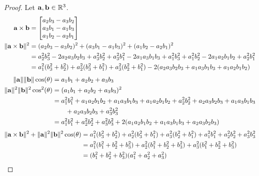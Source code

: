 \documentclass[../main.tex]{subfiles}
\begin{document}
\begin{proof}
	Let $\mathbf{a}, \mathbf{b} \in \mathbb{R}^3$.
	\begin{align*}
		\mathbf{a}\times\mathbf{b}       & =\begin{bmatrix}a_2b_3-a_3b_2\\a_3b_1-a_1b_3\\a_1b_2-a_2b_1\end{bmatrix}                                     \\
		\|\mathbf{a}\times\mathbf{b}\|^2 & =(a_2b_3-a_3b_2)^2+(a_3b_1-a_1b_3)^2+(a_1b_2-a_2b_1)^2                                                       \\
		                             & =a_2^2b_3^2-2a_2a_3b_2b_3+a_3^2b_2^2+a_3^2b_1^2-2a_1a_3b_1b_3+a_1^2b_3^2+a_1^2b_2^2-2a_1a_2b_1b_2+a_2^2b_1^2 \\
		                             & =a_1^2(b_3^2+b_2^2)+a_2^2(b_3^2+b_1^2)+a_3^2(b_2^2+b_1^2)-2(a_2a_3b_2b_3+a_1a_3b_1b_3+a_1a_2b_1b_2)          \\
	\end{align*}
	\begin{align*}
		\|\mathbf{a}\|\|\mathbf{b}\|\cos (\theta)       & =a_1b_1+a_2b_2+a_3b_3                                                                   \\
		\|\mathbf{a}\|^2\|\mathbf{b}\|^2\cos^2 (\theta) & =(a_1b_1+a_2b_2+a_3b_3)^2                                                               \\
		                                            & =a_1^2b_1^2+a_1a_2b_1b_2+a_1a_3b_1b_3+a_1a_2b_1b_2+a_2^2b_2^2+a_2a_3b_2b_3+a_1a_3b_1b_3 \\
		                                            & \qquad +a_2a_3b_2b_3+a_3^2b_3^2                                                         \\
		                                            & =a_1^2b_1^2+a_2^2b_2^2+a_3^2b_3^2+2(a_1a_2b_1b_2+a_1a_3b_1b_3+a_2a_3b_2b_3)
	\end{align*}
	\begin{align*}
		\|\vect{a}\times\vect{b}\|^2+\|\vect{a}\|^2\|\vect{b}\|^2\cos (\theta) & =a_1^2(b_3^2+b_2^2)+a_2^2(b_3^2+b_1^2)+a_3^2(b_2^2+b_1^2)+a_1^2b_1^2+a_2^2b_2^2+a_3^2b_3^2 \\
		                                                                       & =a_1^2(b_1^2+b_2^2+b_3^2)+a_2^2(b_1^2+b_2^2+b_3^2)+a_3^2(b_1^2+b_2^2+b_3^2)                \\
		                                                                       & =(b_1^2+b_2^2+b_3^2)(a_1^2+a_2^2+a_3^2)                                                    \\

\end{align*}
\end{proof}
\end{document}
